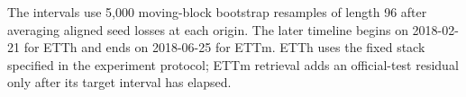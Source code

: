 The intervals use 5,000 moving-block bootstrap resamples of length 96 after
averaging aligned seed losses at each origin. The later timeline begins on
2018-02-21 for ETTh and ends on 2018-06-25 for ETTm. ETTh uses the fixed stack
specified in the experiment protocol; ETTm retrieval adds an official-test
residual only after its target interval has elapsed.
